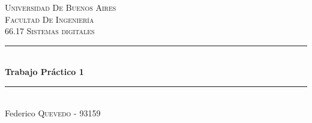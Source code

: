 \documentclass{article}
\begin{document}
\begin{titlepage}

\newcommand{\HRule}{\rule{\linewidth}{0.5mm}} %

\center %
 

\textsc{\LARGE Universidad De Buenos Aires}\\[1.5cm] %
\textsc{\Large Facultad De Ingeniería}\\[0.5cm] %
\textsc{\large 66.17 Sistemas digitales}\\[0.5cm] %


\HRule \\[0.4cm]
{ \huge \bfseries Trabajo Práctico 1}\\[0.4cm] %
\HRule \\[1.5cm]
 

\Large Federico \textsc{Quevedo} - 93159\\ %
[5cm] %



\end{titlepage}
\end{document}
